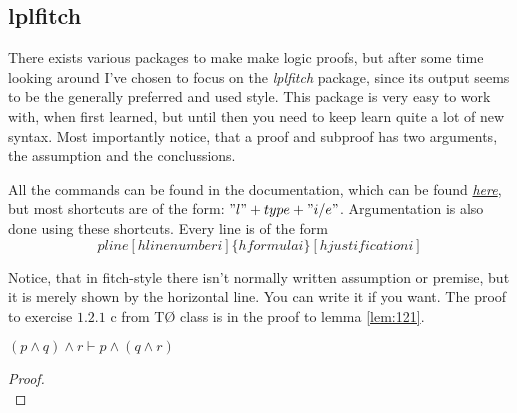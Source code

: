 \documentclass[a4, english]{article}
\begin{document}
\subsection{lplfitch}
There exists various packages to make make logic proofs, but after some time looking around I've chosen to focus on the \emph{lplfitch} package, since its output seems to be the generally preferred and used style.
This package is very easy to work with, when first learned, but until then you need to keep learn quite a lot of new syntax. Most importantly notice, that a proof and subproof has two arguments, the assumption and the conclussions.
\begin{center}
\end{center}

All the commands can be found in the documentation, which can be found \href{http://mirrors.dotsrc.org/ctan/macros/latex/contrib/lplfitch/lplfitch.pdf}{\emph{here}}, but most shortcuts are of the form: $"l" + type + "i/e"$. Argumentation is also done using these shortcuts. Every line is of the form
\begin{equation*}
    pline[hline number i]\{hformulai\}[hjustificationi]
\end{equation*}

Notice, that in fitch-style there isn't normally written assumption or premise, but it is merely shown by the horizontal line. You can write it if you want. The proof to exercise $1.2.1$ c from TØ class is in the proof to lemma \ref{lem:121}.
\begin{lemma} \label{lem:121}
	$(p \wedge q) \wedge r \vdash p \wedge (q \wedge r)$
\end{lemma}
\begin{proof}
	 \\
\end{proof}
\end{document}
